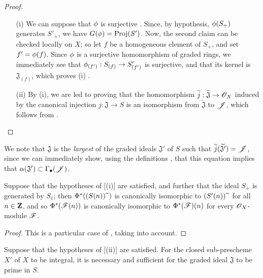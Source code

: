 \begin{proof}
\medskip\noindent
\begin{enumerate}
  \item[\rm{(i)}] We can suppose that $\phi$ is surjective .
    Since, by hypothesis, $\phi(S_+)$ generates $S'_+$, we have $G(\phi)=\operatorname{Proj}(S')$.
    Now, the second claim can be checked locally on $X$;
    so let $f$ be a homogeneous element of $S_+$, and set $f'=\phi(f)$.
    Since $\phi$ is a surjective homomorphism of graded rings, we immediately see that $\vphi_{(f')}:S_{(f)}\to S'_{(f')}$ is surjective, and that its kernel is $\mathfrak{J}_{(f)}$, which proves (i) .
  \item[\rm{(ii)}] By (i), we are led to proving that the homomorphism $\widetilde{j}:\widetilde{\mathfrak{J}}\to\sh{O}_X$ induced by the canonical injection $j:\mathfrak{J}\to S$ is an isomorphism from $\widetilde{\mathfrak{J}}$ to $\mathscr{J}$, which follows from .
\end{enumerate}
\end{proof}

We note that $\mathfrak{J}$ is the \emph{largest} of the graded ideals $\mathfrak{J}'$ of $S$ such that $\widetilde{j}(\widetilde{\mathfrak{J'}})=\mathscr{J}$, since we can immediately show, using the definitions , that this equation implies that $\alpha(\mathfrak{J}')\subset\Gamma_\bullet(\mathscr{J})$.

\begin{corollary}[2.9.3]
\label{II.2.9.3}
Suppose that the hypotheses of [(i)] are satisfied, and further that the ideal $S_+$ is generated by $S_1$;
then $\Phi^*((S(n)){\,\widetilde{\,}\,})$ is canonically isomorphic to $(S'(n)){\,\widetilde{\,}\,}$ for all $n\in\mathbf{Z}$, and so $\Phi^*(\mathscr{F}(n))$ is canonically isomorphic to $\Phi^*(\mathscr{F})(n)$ for every $\mathscr{O}_X$-module $\mathscr{F}$.
\end{corollary}

\begin{proof}
This is a particular case of , taking  into account.
\end{proof}

\begin{corollary}[2.9.4]
\label{II.2.9.4}
Suppose that the hypotheses of [(ii)] are satisfied.
For the closed sub-prescheme $X'$ of $X$ to be integral, it is necessary and sufficient for the graded ideal $\mathfrak{J}$ to be prime in $S$.
\end{corollary}

